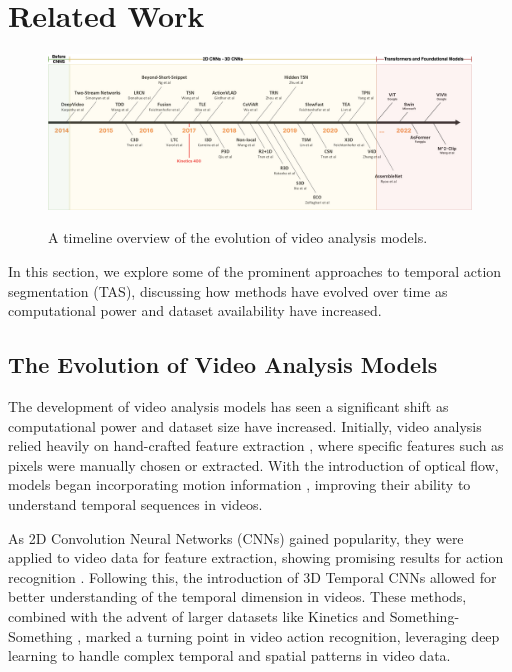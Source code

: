 \section{Related Work}

\begin{figure}[t]
    \centering
    \includegraphics[width=\textwidth]{../../assets/figures/extended-video-timeline-v3.png}
    \caption{A timeline overview of the evolution of video analysis models.}
    \label{figure:video-models-evolution}
    \cite{video-action-recognition-study}
\end{figure}

In this section, we explore some of the prominent approaches to temporal action segmentation (TAS), discussing how methods have evolved over time as computational power and dataset availability have increased.

\subsection{The Evolution of Video Analysis Models}

The development of video analysis models has seen a significant shift as computational power and dataset size have increased. Initially, video analysis relied heavily on hand-crafted feature extraction \cite{handcrafted-features-1,handcrafted-features-2}, where specific features such as pixels were manually chosen or extracted. With the introduction of optical flow, models began incorporating motion information \cite{i3d}, improving their ability to understand temporal sequences in videos.

As 2D Convolution Neural Networks (CNNs) gained popularity, they were applied to video data for feature extraction, showing promising results for action recognition \cite{tsn}. Following this, the introduction of 3D Temporal CNNs \cite{s3d,resnet-3d,x3d,i3d,slowfast} allowed for better understanding of the temporal dimension in videos. These methods, combined with the advent of larger datasets like Kinetics \cite{kinetics-400-dataset} and Something-Something \cite{something-something-dataset}, marked a turning point in video action recognition, leveraging deep learning to handle complex temporal and spatial patterns in video data.

